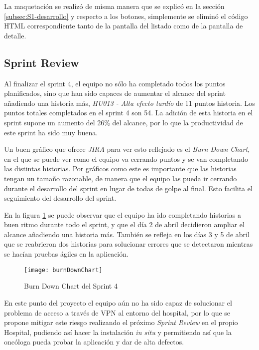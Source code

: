 La maquetación se realizó de misma manera que se explicó en la sección \ref{subsec:S1-desarrollo} y respecto a los botones, simplemente se eliminó el código HTML correspondiente tanto de la pantalla del listado como de la pantalla de detalle.
\subsection{Sprint Review}
\label{subsec:S4-SR}

Al finalizar el sprint 4, el equipo no sólo ha completado todos los puntos planificados, sino que han sido capaces de aumentar el alcance del sprint añadiendo una historia más, \emph{HU013 - Alta efecto tardío} de 11 puntos historia. Los puntos totales completados en el sprint 4 son 54. La adición de esta historia en el sprint supone un aumento del 26\% del alcance, por lo que la productividad de este sprint ha sido muy buena.

Un buen gráfico que ofrece \emph{JIRA} para ver esto reflejado es el \emph{Burn Down Chart}, en el que se puede ver como el equipo va cerrando puntos y se van completando las distintas historias. Por gráficos como este es importante que las historias tengan un tamaño razonable, de manera que el equipo las pueda ir cerrando durante el desarrollo del sprint en lugar de todas de golpe al final. Esto facilita el seguimiento del desarrollo del sprint.

En la figura \ref{fig:burnDownChart} se puede observar que el equipo ha ido completando historias a buen ritmo durante todo el sprint, y que el día 2 de abril decidieron ampliar el alcance añadiendo una historia más. También se refleja en los días 3 y 5 de abril que se reabrieron dos historias para solucionar errores que se detectaron mientras se hacían pruebas ágiles en la aplicación.

\begin{figure}[!h]
\begin{center}
\texttt{[image: burnDownChart]}
\caption{Burn Down Chart del Sprint 4}
\label{fig:burnDownChart}
\end{center}
\end{figure}

En este punto del proyecto el equipo aún no ha sido capaz de solucionar el problema de acceso a través de VPN al entorno del hospital, por lo que se propone mitigar este riesgo realizando el próximo \emph{Sprint Review} en el propio Hospital, pudiendo así hacer la instalación \emph{in situ} y permitiendo así que la oncóloga pueda probar la aplicación y dar de alta defectos.

